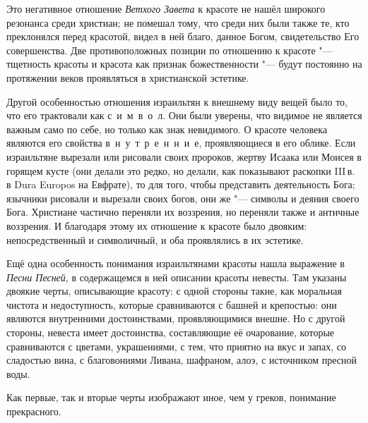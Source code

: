 Это негативное отношение \emph{Ветхого Завета} к красоте не нашёл широкого резонанса среди христиан; не помешал тому, что среди них были также те, кто преклонялся перед красотой, видел в ней благо, данное Богом, свидетельство Его совершенства. Две противоположных позиции по отношению к красоте "--- тщетность красоты и красота как признак божественности "--- будут постоянно на протяжении веков проявляться в христианской эстетике.

Другой особенностью отношения израильтян к внешнему виду вещей было то, что его трактовали как с~и~м~в~о~л. Они были уверены, что видимое не является важным само по себе, но только как знак невидимого. О красоте человека являются его свойства в~н~у~т~р~е~н~н~и~е, проявляющиеся в его облике. Если израильтяне вырезали или рисовали своих пророков, жертву Исаака или Моисея в горящем кусте (они делали это редко, но делали, как показывают раскопки III\,в. в Dura Europos на Евфрате), то для того, чтобы представить деятельность Бога; язычники рисовали и вырезали своих богов, они же "--- символы и деяния своего Бога. Христиане частично переняли их воззрения, но переняли также и античные воззрения. И благодаря этому их отношение к красоте было двояким: непосредственный и символичный, и оба проявлялись в их эстетике.

Ещё одна особенность понимания израильтянами красоты нашла выражение в \emph{Песни Песней}, в содержащемся в ней описании красоты невесты. Там указаны двоякие черты, описывающие красоту: с одной стороны такие, как моральная чистота и недоступность, которые сравниваются с башней и крепостью: они являются внутренними достоинствами, проявляющимися внешне. Но с другой стороны, невеста имеет достоинства, составляющие её очарование, которые сравниваются с цветами, украшениями, с тем, что приятно на вкус и запах, со сладостью вина, с благовониями Ливана, шафраном, алоэ, с источником пресной воды. 

Как первые, так и вторые черты изображают иное, чем у греков, понимание прекрасного.

